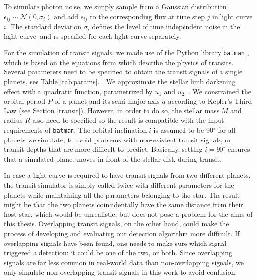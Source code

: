 To simulate photon noise, we simply sample from a Gaussian distribution $\epsilon_{ij} \sim \mathcal{N}(0, \sigma_i)$ and add $\epsilon_{ij}$ to the corresponding flux at time step $j$ in light curve $i$. The standard deviation $\sigma_i$ defines the level of time independent noise in the light curve, and is specified for each light curve separately.

For the simulation of transit signals, we made use of the Python library \texttt{batman} \citep{kreidberg2015batman}, which is based on the equations from \cite{mandel2002analytic} which describe the physics of transits. Several parameters need to be specified to obtain the transit signals of a single planets, see Table \ref{tab:params}. . We approximate the stellar limb darkening effect with a quadratic function, parametrized by $u_1$ and $u_2$. . We constrained the orbital period $P$ of a planet and its semi-major axis $a$ according to Kepler's Third Law (see Section \ref{transit}). However, in order to do so, the stellar mass $M$ and radius $R$ also need to specified so the result is compatible with the input requirements of \texttt{batman}. The orbital inclination $i$ is assumed to be 90$^\circ$ for all planets we simulate, to avoid problems with non-existent transit signals, or transit depths that are more difficult to predict. Basically, setting $i=90^\circ$ ensures that a simulated planet moves in front of the stellar disk during transit.

In case a light curve is required to have transit signals from two different planets, the transit simulator is simply called twice with different parameters for the planets while maintaining all the parameters belonging to the star. The result might be that the two planets coincidentally have the same distance from their host star, which would be unrealistic, but does not pose a problem for the aims of this thesis. Overlapping transit signals, on the other hand, could make the process of developing and evaluating our detection algorithm more difficult. If overlapping signals have been found, one needs to make sure which signal triggered a detection: it could be one of the two, or both. Since overlapping signals are far less common in real-world data than non-overlapping signals, we only simulate non-overlapping transit signals in this work to avoid confusion.


